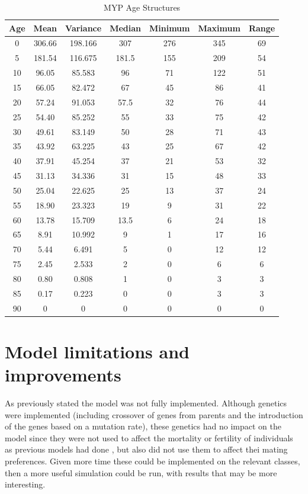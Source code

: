 \documentclass[authoryearcitations]{UoYCSproject}
\begin{document}
\begin{table}[h]
\caption{MYP Age Structures}
\label{tbl:mypAge}
\begin{tabular}{c c c c c c c}
\textbf{Age} & \textbf{Mean} & \textbf{Variance} & \textbf{Median} & \textbf{Minimum} & \textbf{Maximum} & \textbf{Range} \\\hline
0 & 306.66 & 198.166 & 307 & 276 & 345 & 69 \\\hline
5 & 181.54 & 116.675 & 181.5 & 155 & 209 & 54 \\\hline
10 & 96.05 & 85.583 & 96 & 71 & 122 & 51 \\\hline
15 & 66.05 & 82.472 & 67 & 45 & 86 & 41 \\\hline
20 & 57.24 & 91.053 & 57.5 & 32 & 76 & 44 \\\hline
25 & 54.40 & 85.252 & 55 & 33 & 75 & 42 \\\hline
30 & 49.61 & 83.149 & 50 & 28 & 71 & 43 \\\hline
35 & 43.92 & 63.225 & 43 & 25 & 67 & 42 \\\hline
40 & 37.91 & 45.254 & 37 & 21 & 53 & 32 \\\hline
45 & 31.13 & 34.336 & 31 & 15 & 48 & 33 \\\hline
50 & 25.04 & 22.625 & 25 & 13 & 37 & 24 \\\hline
55 & 18.90 & 23.323 & 19 & 9 & 31 & 22 \\\hline
60 & 13.78 & 15.709 & 13.5 & 6 & 24 & 18 \\\hline
65 & 8.91 & 10.992 & 9 & 1 & 17 & 16 \\\hline
70 & 5.44 & 6.491 & 5 & 0 & 12 & 12 \\\hline
75 & 2.45 & 2.533 & 2 & 0 & 6 & 6 \\\hline
80 & 0.80 & 0.808 & 1 & 0 & 3 & 3 \\\hline
85 & 0.17 & 0.223 & 0 & 0  & 3 & 3 \\\hline
90 & 0 & 0 & 0 & 0 & 0 & 0
\end{tabular}
\end{table}

\section{Model limitations and improvements}
As previously stated the model was not fully implemented. Although genetics were implemented (including crossover of genes from parents and the introduction of the genes based on a mutation rate), these genetics had no impact on the model since they were not used to affect the mortality or fertility of individuals as previous models had done \cite{mateChoice2013}, but also did not use them to affect thei mating preferences. Given more time these could be implemented on the relevant classes, then a more useful simulation could be run, with results that may be more interesting.
\end{document}
